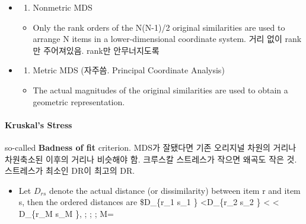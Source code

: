 \documentclass[
]{book}
\providecommand{\tightlist}{%
  \setlength{\itemsep}{0pt}\setlength{\parskip}{0pt}}
\begin{document}
{{{\begin{itemize}
  \begin{itemize}
  \tightlist
  \item
    For a given set of observed similarities (or distances) between every pair of N items, find a representative of the items in as few dimensions as possible such that the similarities (or distances) in the lower dimensions match, as close as possible with the original similarities (or distances).
  \end{itemize}
\item
  \begin{enumerate}
  \def\labelenumi{\arabic{enumi}.}
  \tightlist
  \item
    Nonmetric MDS
  \end{enumerate}

  \begin{itemize}
  \tightlist
  \item
    Only the rank orders of the N(N-1)/2 original similarities are used to arrange N items in a lower-dimensional coordinate system. 거리 없이 rank만 주어져있음. rank만 안무너지도록
  \end{itemize}
\item
  \begin{enumerate}
  \def\labelenumi{\arabic{enumi}.}
  \setcounter{enumi}{1}
  \tightlist
  \item
    Metric MDS (자주씀. Principal Coordinate Analysis)
  \end{enumerate}

  \begin{itemize}
  \tightlist
  \item
    The actual magnitudes of the original similarities are used to obtain a geometric representation.
  \end{itemize}
\end{itemize}

\hypertarget{kruskals-stress}{%
\paragraph{\texorpdfstring{\textbf{Kruskal's Stress}}{Kruskal's Stress}}\label{kruskals-stress}}

so-called \textbf{Badness of fit} criterion. MDS가 잘됐다면 기존 오리지널 차원의 거리나 차원축소된 이후의 거리나 비슷해야 함. 크루스칼 스트레스가 작으면 왜곡도 작은 것. 스트레스가 최소인 DR이 최고의 DR.

\begin{itemize}
\item
  Let \(D_{rs}\) denote the actual distance (or dissimilarity) between item r and item s, then the ordered distances are \$D\_\{r\_1 s\_1 \} \textless D\_\{r\_2 s\_2 \} \textless{} \cdots \textless{} D\_\{r\_M s\_M \}, ; ; ; M=


\end{itemize}}}}
\end{document}
